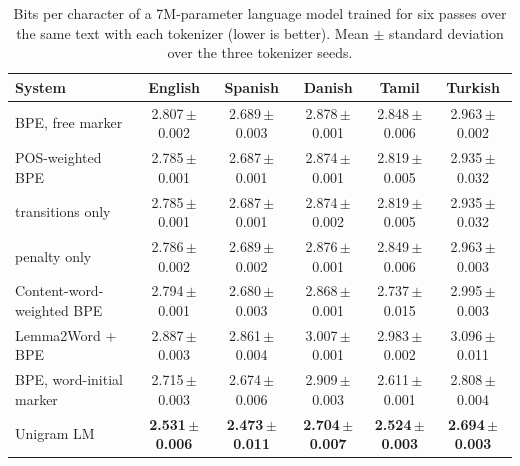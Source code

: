 \begin{table}[!ht]
\centering
\caption{Bits per character of a 7M-parameter language model trained for six passes over the same text with each tokenizer (lower is better). Mean $\pm$ standard deviation over the three tokenizer seeds.}
\label{tab:bpc}
\small
\setlength{\tabcolsep}{4pt}
\begin{tabular}{lccccc}
\toprule
System & English & Spanish & Danish & Tamil & Turkish \\
\midrule
BPE, free marker & 2.807\,{\scriptsize$\pm$0.002} & 2.689\,{\scriptsize$\pm$0.003} & 2.878\,{\scriptsize$\pm$0.001} & 2.848\,{\scriptsize$\pm$0.006} & 2.963\,{\scriptsize$\pm$0.002} \\
POS-weighted BPE & 2.785\,{\scriptsize$\pm$0.001} & 2.687\,{\scriptsize$\pm$0.001} & 2.874\,{\scriptsize$\pm$0.001} & 2.819\,{\scriptsize$\pm$0.005} & 2.935\,{\scriptsize$\pm$0.032} \\
\quad transitions only & 2.785\,{\scriptsize$\pm$0.001} & 2.687\,{\scriptsize$\pm$0.001} & 2.874\,{\scriptsize$\pm$0.002} & 2.819\,{\scriptsize$\pm$0.005} & 2.935\,{\scriptsize$\pm$0.032} \\
\quad penalty only & 2.786\,{\scriptsize$\pm$0.002} & 2.689\,{\scriptsize$\pm$0.002} & 2.876\,{\scriptsize$\pm$0.001} & 2.849\,{\scriptsize$\pm$0.006} & 2.963\,{\scriptsize$\pm$0.003} \\
\addlinespace[2pt]
Content-word-weighted BPE & 2.794\,{\scriptsize$\pm$0.001} & 2.680\,{\scriptsize$\pm$0.003} & 2.868\,{\scriptsize$\pm$0.001} & 2.737\,{\scriptsize$\pm$0.015} & 2.995\,{\scriptsize$\pm$0.003} \\
Lemma2Word + BPE & 2.887\,{\scriptsize$\pm$0.003} & 2.861\,{\scriptsize$\pm$0.004} & 3.007\,{\scriptsize$\pm$0.001} & 2.983\,{\scriptsize$\pm$0.002} & 3.096\,{\scriptsize$\pm$0.011} \\
BPE, word-initial marker & 2.715\,{\scriptsize$\pm$0.003} & 2.674\,{\scriptsize$\pm$0.006} & 2.909\,{\scriptsize$\pm$0.003} & 2.611\,{\scriptsize$\pm$0.001} & 2.808\,{\scriptsize$\pm$0.004} \\
Unigram LM & \textbf{2.531\,{\scriptsize$\pm$0.006}} & \textbf{2.473\,{\scriptsize$\pm$0.011}} & \textbf{2.704\,{\scriptsize$\pm$0.007}} & \textbf{2.524\,{\scriptsize$\pm$0.003}} & \textbf{2.694\,{\scriptsize$\pm$0.003}} \\
\bottomrule
\end{tabular}
\end{table}
